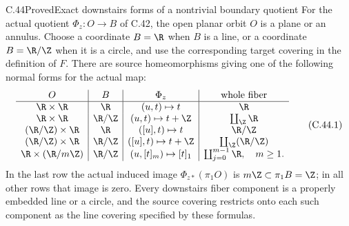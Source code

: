 \begin{claim}{C.44}{Proved}{Exact downstairs forms of a nontrivial boundary quotient}
For the actual quotient $\Phi_z:O\to B$ of C.42,
the open planar orbit $O$ is a plane or an annulus.
Choose a coordinate $B=\R$ when $B$ is a line,
or a coordinate $B=\R/\Z$ when it is a circle,
and use the corresponding target covering in
the definition of $F$. There are source
homeomorphisms giving one of the following
normal forms for the actual map:
\[
\begin{array}{c|c|c|c}
 O & B & \Phi_z & \text{whole fiber}\\ \hline
 \R\times\R & \R & (u,t)\mapsto t & \R\\
 \R\times\R & \R/\Z & (u,t)\mapsto t+\Z
       & \coprod_{\Z}\R\\
 (\R/\Z)\times\R & \R & ([u],t)\mapsto t
       & \R/\Z\\
 (\R/\Z)\times\R & \R/\Z & ([u],t)\mapsto t+\Z
       & \coprod_{\Z}(\R/\Z)\\
 \R\times(\R/m\Z) & \R/\Z & (u,[t]_m)\mapsto[t]_1
       & \coprod_{j=0}^{m-1}\R,\quad m\geq1 .
\end{array}                                             \tag{C.44.1}
\]
In the last row the actual induced image
$\Phi_{z*}(\pi_1O)$ is $m\Z\subset\pi_1B=\Z$;
in all other rows that image is zero.
Every downstairs fiber component is a
properly embedded line or a circle, and
the source covering restricts onto each
such component as the line covering
specified by these formulas.
\end{claim}

